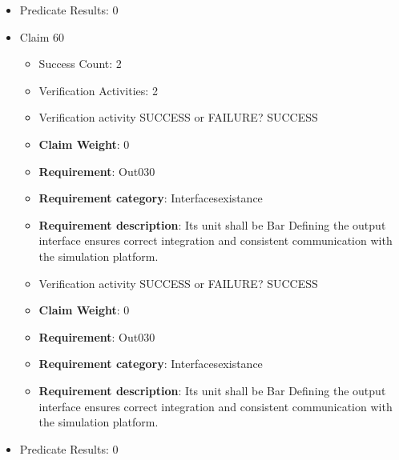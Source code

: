 \documentclass{article}
\begin{document}
\begin{itemize}
\begin{itemize}
					\item Verification activity SUCCESS or FAILURE? SUCCESS
					\item \textbf{Claim Weight}: 0
						\item \textbf{Requirement}: Out029 
						\item \textbf{Requirement category}: Interfacesexistance 
						\item \textbf{Requirement description}: Its unit shall be Bar Defining the output interface ensures correct integration and consistent communication with the simulation platform.
					
				\end{itemize}
				
									    
				\item Predicate Results: 0

  				  \item Claim 60
				\begin{itemize}
			    	\item Success Count: 2 
			    	\item Verification Activities: 2
					\item Verification activity SUCCESS or FAILURE? SUCCESS
					\item \textbf{Claim Weight}: 0
						\item \textbf{Requirement}: Out030 
						\item \textbf{Requirement category}: Interfacesexistance 
						\item \textbf{Requirement description}: Its unit shall be Bar Defining the output interface ensures correct integration and consistent communication with the simulation platform.
					
					\item Verification activity SUCCESS or FAILURE? SUCCESS
					\item \textbf{Claim Weight}: 0
						\item \textbf{Requirement}: Out030 
						\item \textbf{Requirement category}: Interfacesexistance 
						\item \textbf{Requirement description}: Its unit shall be Bar Defining the output interface ensures correct integration and consistent communication with the simulation platform.
					
				\end{itemize}
				
									    
				\item Predicate Results: 0


\end{itemize}
\end{document}
